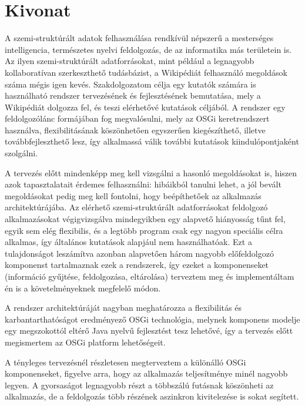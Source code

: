 \chapter*{Kivonat}

A szemi-struktúrált adatok felhasználása rendkívül népszerű a mesterséges intelligencia, természetes nyelvi feldolgozás, de az informatika más területein is. Az ilyen szemi-struktúrált adatforrásokat, mint például a legnagyobb kollaboratívan szerkeszthető tudásbázist, a Wikipédiát felhasználó megoldások száma mégis igen kevés. Szakdolgozatom célja egy kutatók számára is használható rendszer tervezésének és fejlesztésének bemutatása, mely a Wikipédiát dolgozza fel, és teszi elérhetővé kutatások céljából. A rendszer egy feldolgozólánc formájában fog megvalósulni, mely az OSGi keretrendszert használva, flexibilitásának köszönhetően egyszerűen kiegészíthető, illetve továbbfejleszthető lesz, így alkalmassá válik további kutatások kiindulópontjaként szolgálni.

A tervezés előtt mindenképp meg kell vizsgálni a hasonló megoldásokat is, hiszen azok tapasztalatait érdemes felhasználni: hibáikból tanulni lehet, a jól bevált megoldásokat pedig meg kell fontolni, hogy beépíthetőek az alkalmazás architektúrájába. Az elérhető szemi-struktúrált adatforrásokat feldolgozó alkalmazásokat végigvizsgálva mindegyikben egy alapvető hiányosság tűnt fel, egyik sem elég flexibilis, és a legtöbb program csak egy nagyon speciális célra alkalmas, így általános kutatások alapjául nem használhatóak. Ezt a tulajdonságot leszámítva azonban alapvetően három nagyobb előfeldolgozó komponenst tartalmaznak ezek a rendszerek, így ezeket a komponenseket (információ gyűjtése, feldolgozása, eltárolása) terveztem meg és implementáltam én is a követelményeknek megfelelő módon.

A rendszer architektúráját nagyban meghatározza a flexibilitás és karbantarthatóságot eredményező OSGi technológia, melynek komponens modelje egy megszokottól eltérő Java nyelvű fejlesztést tesz lehetővé, így a tervezés előtt megismertem az OSGi platform lehetőségeit.

A tényleges tervezésnél részletesen megterveztem a különálló OSGi komponenseket, figyelve arra, hogy az alkalmazás teljesítménye minél nagyobb legyen. A gyorsaságot legnagyobb részt a többszálú futásnak köszönheti az alkalmazás, de a feldolgozás több részének aszinkron kivitelezése is sokat segített.

